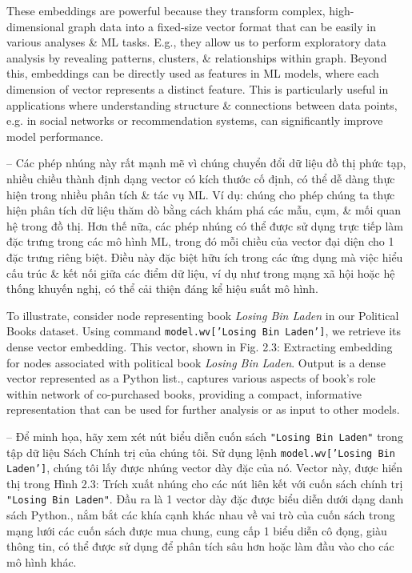 \documentclass{article}
\begin{document}
\begin{itemize}
\begin{itemize}
\begin{itemize}
           These embeddings are powerful because they transform complex, high-dimensional graph data into a fixed-size vector format that can be easily in various analyses \& ML tasks. E.g., they allow us to perform exploratory data analysis by revealing patterns, clusters, \& relationships within graph. Beyond this, embeddings can be directly used as features in ML models, where each dimension of vector represents a distinct feature. This is particularly useful in applications where understanding structure \& connections between data points, e.g. in social networks or recommendation systems, can significantly improve model performance.

           -- Các phép nhúng này rất mạnh mẽ vì chúng chuyển đổi dữ liệu đồ thị phức tạp, nhiều chiều thành định dạng vector có kích thước cố định, có thể dễ dàng thực hiện trong nhiều phân tích \& tác vụ ML. Ví dụ: chúng cho phép chúng ta thực hiện phân tích dữ liệu thăm dò bằng cách khám phá các mẫu, cụm, \& mối quan hệ trong đồ thị. Hơn thế nữa, các phép nhúng có thể được sử dụng trực tiếp làm đặc trưng trong các mô hình ML, trong đó mỗi chiều của vector đại diện cho 1 đặc trưng riêng biệt. Điều này đặc biệt hữu ích trong các ứng dụng mà việc hiểu cấu trúc \& kết nối giữa các điểm dữ liệu, ví dụ như trong mạng xã hội hoặc hệ thống khuyến nghị, có thể cải thiện đáng kể hiệu suất mô hình.

           To illustrate, consider node representing book {\it Losing Bin Laden} in our Political Books dataset. Using command {\tt model.wv['Losing Bin Laden']}, we retrieve its dense vector embedding. This vector, shown in {\sf Fig. 2.3: Extracting embedding for nodes associated with political book {\it Losing Bin Laden}. Output is a dense vector represented as a Python list.}, captures various aspects of book's role within network of co-purchased books, providing a compact, informative representation that can be used for further analysis or as input to other models.

           -- Để minh họa, hãy xem xét nút biểu diễn cuốn sách {\tt "Losing Bin Laden"} trong tập dữ liệu Sách Chính trị của chúng tôi. Sử dụng lệnh {\tt model.wv['Losing Bin Laden']}, chúng tôi lấy được nhúng vector dày đặc của nó. Vector này, được hiển thị trong {\sf Hình 2.3: Trích xuất nhúng cho các nút liên kết với cuốn sách chính trị {\tt "Losing Bin Laden"}. Đầu ra là 1 vector dày đặc được biểu diễn dưới dạng danh sách Python.}, nắm bắt các khía cạnh khác nhau về vai trò của cuốn sách trong mạng lưới các cuốn sách được mua chung, cung cấp 1 biểu diễn cô đọng, giàu thông tin, có thể được sử dụng để phân tích sâu hơn hoặc làm đầu vào cho các mô hình khác.


\end{itemize}
\end{itemize}
\end{itemize}
\end{document}
